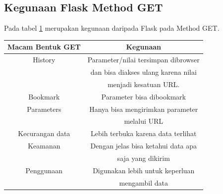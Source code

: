 \subsection{Kegunaan Flask Method GET}
Pada tabel \ref{table:contoh} merupakan kegunaan daripada Flask pada Method GET.
\begin{table}[h]
\begin{tabular}{|c|c|}
\hline
Macam Bentuk GET&Kegunaan\\
\hline
History&Parameter/nilai tersimpan dibrowser\\
&dan bisa diakses ulang karena nilai\\
&menjadi kesatuan URL.\\
Bookmark&Parameter bisa dibookmark\\
Parameters&Hanya bisa mengirimkan parameter\\
&melalui URL\\
Kecurangan data&Lebih terbuka karena data terlihat\\
Keamanan&Dengan jelas bisa ketahui data apa \\
&saja yang dikirim\\
Penggunaan&Digunakan lebih untuk keperluan \\
&mengambil data\\
\hline
\end{tabular}
\label{table:contoh}
\end{table}





